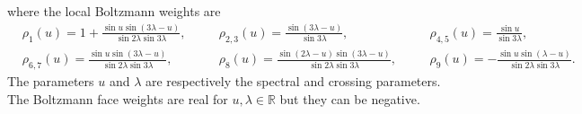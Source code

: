 \documentclass[11pt]{article}
\numberwithin{equation}{section}
\theoremstyle{plain}
\numberwithin{equation}{section}
\begin{document}
where the local Boltzmann weights are
\begin{subequations}
\label{eq:weights}
\begin{alignat}{4}
&\rho_1(u)=1+\frac{\sin u\sin(3\lambda-u)}{\sin 2\lambda \sin 3\lambda}, \quad
&&\rho_{2,3}(u)= \frac{\sin(3\lambda-u)}{\sin 3\lambda}, \quad
&&\rho_{4,5}(u)=\frac{\sin u}{\sin3\lambda},\\[0.15cm]
&\rho_{6,7}(u)= \frac{\sin u\sin(3\lambda-u)}{\sin2\lambda\sin3\lambda}, \quad
&&\rho_8(u)= \frac{\sin(2\lambda-u)\sin(3\lambda-u)}{\sin2\lambda\sin3\lambda}, \quad
&&\rho_9(u)= -\frac{\sin u\sin(\lambda-u)}{\sin2\lambda\sin3\lambda}.
\end{alignat}
\end{subequations}
The parameters $u$ and $\lambda$ are respectively the spectral and crossing parameters. The Boltzmann face weights are real for $u,\lambda \in \mathbb R$ but they can be negative.
\end{document}
